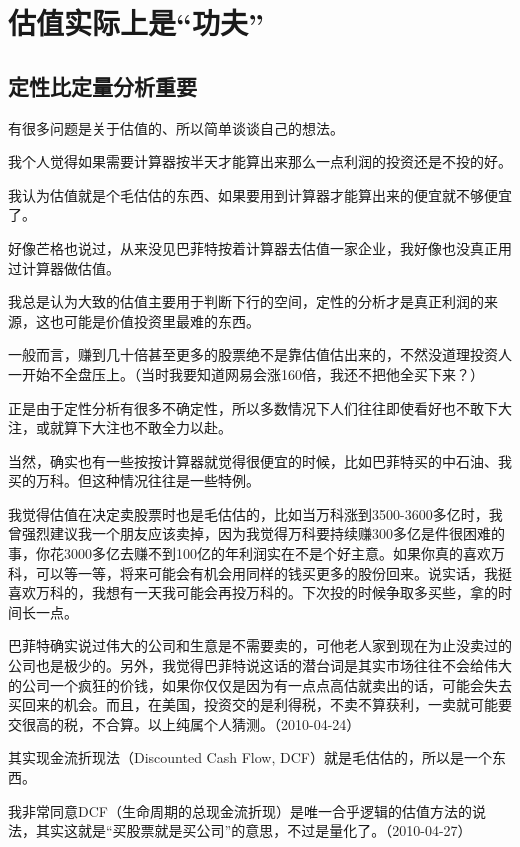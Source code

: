 
\section{估值实际上是“功夫”}

\subsection{定性比定量分析重要}

有很多问题是关于估值的、所以简单谈谈自己的想法。

我个人觉得如果需要计算器按半天才能算出来那么一点利润的投资还是不投的好。

我认为估值就是个毛估估的东西、如果要用到计算器才能算出来的便宜就不够便宜了。

好像芒格也说过，从来没见巴菲特按着计算器去估值一家企业，我好像也没真正用过计算器做估值。

我总是认为大致的估值主要用于判断下行的空间，定性的分析才是真正利润的来源，这也可能是价值投资里最难的东西。

一般而言，赚到几十倍甚至更多的股票绝不是靠估值估出来的，不然没道理投资人一开始不全盘压上。（当时我要知道网易会涨160倍，我还不把他全买下来？）

正是由于定性分析有很多不确定性，所以多数情况下人们往往即使看好也不敢下大注，或就算下大注也不敢全力以赴。

当然，确实也有一些按按计算器就觉得很便宜的时候，比如巴菲特买的中石油、我买的万科。但这种情况往往是一些特例。

我觉得估值在决定卖股票时也是毛估估的，比如当万科涨到3500-3600多亿时，我曾强烈建议我一个朋友应该卖掉，因为我觉得万科要持续赚300多亿是件很困难的事，你花3000多亿去赚不到100亿的年利润实在不是个好主意。如果你真的喜欢万科，可以等一等，将来可能会有机会用同样的钱买更多的股份回来。说实话，我挺喜欢万科的，我想有一天我可能会再投万科的。下次投的时候争取多买些，拿的时间长一点。

巴菲特确实说过伟大的公司和生意是不需要卖的，可他老人家到现在为止没卖过的公司也是极少的。另外，我觉得巴菲特说这话的潜台词是其实市场往往不会给伟大的公司一个疯狂的价钱，如果你仅仅是因为有一点点高估就卖出的话，可能会失去买回来的机会。而且，在美国，投资交的是利得税，不卖不算获利，一卖就可能要交很高的税，不合算。以上纯属个人猜测。（2010-04-24）

其实现金流折现法（Discounted Cash Flow, DCF）就是毛估估的，所以是一个东西。

我非常同意DCF（生命周期的总现金流折现）是唯一合乎逻辑的估值方法的说法，其实这就是“买股票就是买公司”的意思，不过是量化了。（2010-04-27）

